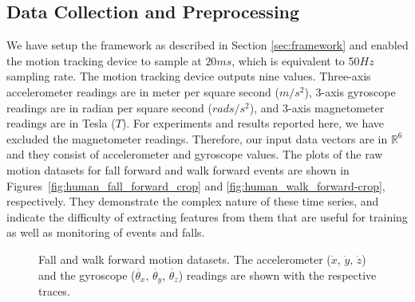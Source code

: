 \documentclass[]{IEEEtran}
\begin{document}
\subsection{Data Collection and Preprocessing  }
\label{subsec:preDataCollection}

We have setup the framework as described in Section \ref{sec:framework} and
enabled the motion tracking device to sample at $20ms$, which is equivalent to
50$Hz$ sampling rate. The motion tracking device outputs nine values.
Three-axis  accelerometer readings are in  meter per square second ($m/s^2$),
3-axis gyroscope readings are in radian per square second ($rads/s^2$), and
3-axis magnetometer readings are  in Tesla ($T$). For experiments  and results
reported here, we have excluded the magnetometer readings. Therefore, our input
data vectors  are in $\mathbb{R}^6$ and they consist of accelerometer and
gyroscope values. The plots of the raw motion datasets for fall forward and
walk forward events are shown in Figures~\ref{fig:human_fall_forward_crop} and
\ref{fig:human_walk_forward-crop}, respectively. They demonstrate the complex
nature of these time series, and indicate the difficulty of extracting features
from them that are useful for training as well as monitoring of events and
falls.



\begin{figure}[!tbh]
\centering
  \mbox{}
  \mbox{}
  \caption{Fall and walk forward motion datasets. The accelerometer ($\dot{x}$, 
  $\dot{y}$, $\dot{z}$) and the gyroscope ($\dot{\theta_x}$, 
  $\dot{\theta_y}$, $\dot{\theta_z}$) readings are shown with the respective traces. }
\end{figure}
\end{document}
